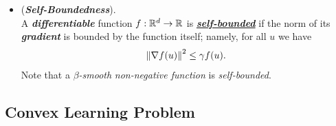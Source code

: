 \documentclass[11pt]{article}
\begin{document}
\begin{itemize}
\item \begin{definition} (\emph{\textbf{Self-Boundedness}}). \\
A \emph{\textbf{differentiable}} function $f : {\mathbb R}^d \to {\mathbb R}$ is \underline{\emph{\textbf{self-bounded}}} if the norm of its \emph{\textbf{gradient}} is bounded by the function itself; namely, for all $u$ we have
\begin{align*}
\left\|\nabla f(u)\right\|_{}^2 \le \gamma f(u).
\end{align*} Note that a \emph{$\beta$-smooth} \emph{non-negative function} is \emph{self-bounded}.
\end{definition}
\end{itemize}
\subsection{Convex Learning Problem}
\end{document}
